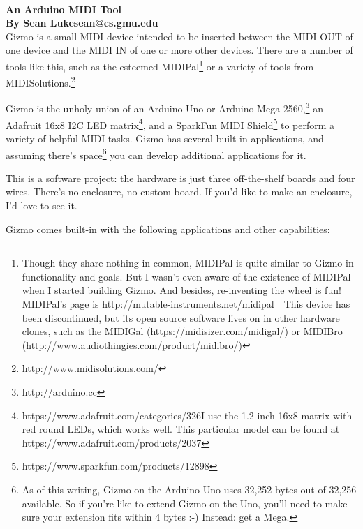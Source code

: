 \documentclass{article}
\begin{document}
\\
{\large \bf An Arduino MIDI Tool\\
By Sean Luke\quad sean@cs.gmu.edu}
\\


\noindent Gizmo is a small MIDI device intended to be inserted between the MIDI OUT of one device and the MIDI IN of one or more other devices.  There are a number of tools like this, such as the esteemed MIDIPal\footnote{Though they share nothing in common, MIDIPal is quite similar to Gizmo in functionality and goals.  But I wasn't even aware of the existence of MIDIPal when I started building Gizmo.  And besides, re-inventing the wheel is fun!  MIDIPal's page is http:/\!/mutable-instruments.net/midipal\ \ This device has been discontinued, but its open source software lives on in other hardware clones, such as the MIDIGal (https:/\!/midisizer.com/midigal/) or MIDIBro (http:/\!/www.audiothingies.com/product/midibro/)} or a variety of tools from MIDISolutions.\footnote{http:/\!/www.midisolutions.com/}

Gizmo is the unholy union of an Arduino Uno or Arduino Mega 2560,\footnote{http:/\!/arduino.cc} an Adafruit 16x8 I2C LED matrix\footnote{https:/\!/www.adafruit.com/categories/326\quad I use the 1.2-inch 16x8 matrix with red round LEDs, which works well.  This particular model can be found at https:/\!/www.adafruit.com/products/2037}, and a SparkFun MIDI Shield\footnote{https:/\!/www.sparkfun.com/products/12898} to perform a variety of helpful MIDI tasks.  Gizmo has several built-in applications, and assuming there's space\footnote{As of this writing, Gizmo on the Arduino Uno uses 32,252 bytes out of 32,256 available.  So if you're like to extend Gizmo on the Uno, you'll need to make sure your extension fits within 4 bytes :-)  Instead: get a Mega.} you can develop additional applications for it.

This is a software project: the hardware is just three off-the-shelf boards and four wires.  There's no enclosure, no custom board.  If you'd like to make an enclosure, I'd love to see it.

Gizmo comes built-in with the following applications and other capabilities:
\end{document}
